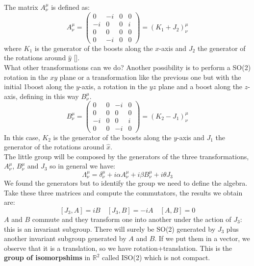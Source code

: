 \documentclass[../main.tex]{subfiles}
\begin{document}
The matrix $A^\mu_\nu$ is defined as:
\[
A^\mu_\nu=\left(\begin{array}{cccc}
    0 & -i & 0 & 0 \\
    -i & 0 & 0 & i \\
    0 & 0 & 0 & 0 \\
    0 & -i & 0 & 0
\end{array}\right)=(K_1+J_2)^\mu_\nu
\]
where $K_1$ is the generator of the boosts along the $x$-axis and $J_2$ the generator of the rotations around $\hat{y}$ [].\\
What other transformations can we do? Another possibility is to perform a SO(2) rotation in the $xy$ plane or a transformation like the previous one but with the initial 1boost along the $y$-axis, a rotation in the $yz$ plane and a boost along the $z$-axis, defining in this way $B^\mu_\nu$.
\[
B^\mu_\nu=\left(\begin{array}{cccc}
    0 & 0 & -i & 0 \\
    0 & 0 & 0 & 0 \\
    -i & 0 & 0 & i \\
    0 & 0 & -i & 0
\end{array}\right)=(K_2-J_1)^\mu_\nu
\]
In this case, $K_2$ is the generator of the boosts along the $y$-axis and $J_1$ the generator of the rotations around $\hat{x}$.\\
The little group will be composed by the generators of the three transformations, $A^\mu_\nu$, $B^\mu_\nu$ and $J_3$ so in general we have:\marginnote{\[
J_3=\left(\begin{array}{cccc}
    0 & 0 & 0 & 0 \\
    0 & 0 & -i & 0 \\
    0 & +i & 0 & 0 \\
    0 & 0 & 0 & 0
\end{array}\right)
\]}
\[
\Lambda^\mu_\nu=\delta^\mu_\nu+i\alpha A^\mu_\nu+i\beta B^\mu_\nu+i\theta J_3
\]
We found the generators but to identify the group we need to define the algebra. Take these three matrices and compute the commutators, the results we obtain are:
\[
[J_3,A]=iB \quad [J_3,B]=-iA \quad [A,B]=0
\]
$A$ and $B$ commute and they transform one into another under the action of $J_3$: this is an invariant subgroup. There will surely be SO(2) generated by $J_3$ plus another invariant subgroup generated by $A$ and $B$. If we put them in a vector, we observe that it is a translation, so we have rotation+translation. This is the \textbf{group of isomorpshims} in $\mathbb{R}^2$ called ISO(2) which is not compact.\\
\end{document}
